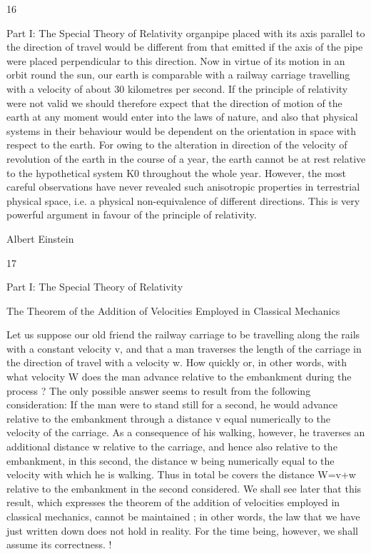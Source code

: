 \documentclass{article}
\begin{document}
16

Part I: The Special Theory of Relativity
organpipe placed with its axis parallel to the direction of travel would be different from that
emitted if the axis of the pipe were placed perpendicular to this direction.
Now in virtue of its motion in an orbit round the sun, our earth is comparable with a
railway carriage travelling with a velocity of about 30 kilometres per second. If the
principle of relativity were not valid we should therefore expect that the direction of motion
of the earth at any moment would enter into the laws of nature, and also that physical
systems in their behaviour would be dependent on the orientation in space with respect to
the earth. For owing to the alteration in direction of the velocity of revolution of the earth in
the course of a year, the earth cannot be at rest relative to the hypothetical system K0
throughout the whole year. However, the most careful observations have never revealed
such anisotropic properties in terrestrial physical space, i.e. a physical non-equivalence of
different directions. This is very powerful argument in favour of the principle of relativity.

Albert Einstein

17

Part I: The Special Theory of Relativity

The Theorem of the
Addition of Velocities
Employed in Classical Mechanics

Let us suppose our old friend the railway carriage to be travelling along the rails with a
constant velocity v, and that a man traverses the length of the carriage in the direction of
travel with a velocity w. How quickly or, in other words, with what velocity W does the
man advance relative to the embankment during the process ? The only possible answer
seems to result from the following consideration: If the man were to stand still for a second,
he would advance relative to the embankment through a distance v equal numerically to the
velocity of the carriage. As a consequence of his walking, however, he traverses an
additional distance w relative to the carriage, and hence also relative to the embankment, in
this second, the distance w being numerically equal to the velocity with which he is
walking. Thus in total be covers the distance W=v+w relative to the embankment in the
second considered. We shall see later that this result, which expresses the theorem of the
addition of velocities employed in classical mechanics, cannot be maintained ; in other
words, the law that we have just written down does not hold in reality. For the time being,
however, we shall assume its correctness.
!
\end{document}

